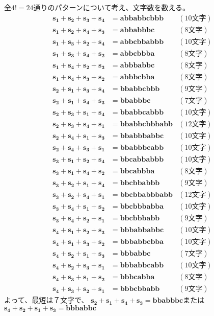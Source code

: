 \documentclass[a4j, uplatex, fleqn, dvipdfmx]{jsarticle} %
\begin{document}
全$4!=24$通りのパターンについて考え、文字数を数える。
\begin{align*}
  \bm{s_1} + \bm{s_2} + \bm{s_3} + \bm{s_4} &= \bm{abbabbcbbb} & (10\mbox{文字})\\
  \bm{s_1} + \bm{s_2} + \bm{s_4} + \bm{s_3} &= \bm{abbabbbc} & (8\mbox{文字})\\
  \bm{s_1} + \bm{s_3} + \bm{s_2} + \bm{s_4} &= \bm{abbcbbabbb} & (10\mbox{文字})\\
  \bm{s_1} + \bm{s_3} + \bm{s_4} + \bm{s_2} &= \bm{abbcbbba} & (8\mbox{文字})\\
  \bm{s_1} + \bm{s_4} + \bm{s_2} + \bm{s_3} &= \bm{abbbabbc} & (8\mbox{文字})\\
  \bm{s_1} + \bm{s_4} + \bm{s_3} + \bm{s_2} &= \bm{abbbcbba} & (8\mbox{文字})\\
  \bm{s_2} + \bm{s_1} + \bm{s_3} + \bm{s_4} &= \bm{bbabbcbbb} & (9\mbox{文字})\\
  \bm{s_2} + \bm{s_1} + \bm{s_4} + \bm{s_3} &= \bm{bbabbbc} & (7\mbox{文字})\\
  \bm{s_2} + \bm{s_3} + \bm{s_1} + \bm{s_4} &= \bm{bbabbcabbb} & (10\mbox{文字})\\
  \bm{s_2} + \bm{s_3} + \bm{s_4} + \bm{s_1} &= \bm{bbabbcbbbabb} & (12\mbox{文字})\\
  \bm{s_2} + \bm{s_4} + \bm{s_1} + \bm{s_3} &= \bm{bbabbbabbc} & (10\mbox{文字})\\
  \bm{s_2} + \bm{s_4} + \bm{s_3} + \bm{s_1} &= \bm{bbabbbcabb} & (10\mbox{文字})\\
  \bm{s_3} + \bm{s_1} + \bm{s_2} + \bm{s_4} &= \bm{bbcabbabbb} & (10\mbox{文字})\\
  \bm{s_3} + \bm{s_1} + \bm{s_4} + \bm{s_2} &= \bm{bbcabbba} & (8\mbox{文字})\\
  \bm{s_3} + \bm{s_2} + \bm{s_1} + \bm{s_4} &= \bm{bbcbbabbb} & (9\mbox{文字})\\
  \bm{s_3} + \bm{s_2} + \bm{s_4} + \bm{s_1} &= \bm{bbcbbabbbabb} & (12\mbox{文字})\\
  \bm{s_3} + \bm{s_4} + \bm{s_1} + \bm{s_2} &= \bm{bbcbbbabba} & (10\mbox{文字})\\
  \bm{s_3} + \bm{s_4} + \bm{s_2} + \bm{s_1} &= \bm{bbcbbbabb} & (9\mbox{文字})\\
  \bm{s_4} + \bm{s_1} + \bm{s_2} + \bm{s_3} &= \bm{bbbabbabbc} & (10\mbox{文字})\\
  \bm{s_4} + \bm{s_1} + \bm{s_3} + \bm{s_2} &= \bm{bbbabbcbba} & (10\mbox{文字})\\
  \bm{s_4} + \bm{s_2} + \bm{s_1} + \bm{s_3} &= \bm{bbbabbc} & (7\mbox{文字})\\
  \bm{s_4} + \bm{s_2} + \bm{s_3} + \bm{s_1} &= \bm{bbbabbcabb} & (10\mbox{文字})\\
  \bm{s_4} + \bm{s_3} + \bm{s_1} + \bm{s_2} &= \bm{bbbcabba} & (8\mbox{文字})\\
  \bm{s_4} + \bm{s_3} + \bm{s_2} + \bm{s_1} &= \bm{bbbcbbabb} & (9\mbox{文字})
\end{align*}
よって、最短は７文字で、
$\bm{s_2} + \bm{s_1} + \bm{s_4} + \bm{s_3} = \bm{bbabbbc}$または
$\bm{s_4} + \bm{s_2} + \bm{s_1} + \bm{s_3} = \bm{bbbabbc}$
\end{document}
